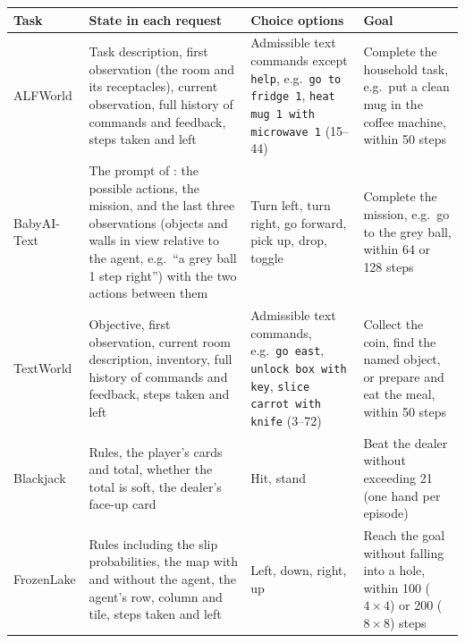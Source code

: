 \begin{tabularx}{\textwidth}{@{}l >{\raggedright\arraybackslash}X >{\raggedright\arraybackslash}p{3.3cm} >{\raggedright\arraybackslash}p{3.4cm}@{}}
    \toprule
    Task & State in each request & Choice options & Goal \\
    \midrule
    ALFWorld & Task description, first observation (the room and its receptacles), current observation, full history of commands and feedback, steps taken and left & Admissible text commands except \texttt{help}, e.g.\ \texttt{go to fridge 1}, \texttt{heat mug 1 with microwave 1} (15--44) & Complete the household task, e.g.\ put a clean mug in the coffee machine, within 50 steps \\
    \rowcolor{gray!10}BabyAI-Text & The prompt of \citet{carta2023grounding}: the possible actions, the mission, and the last three observations (objects and walls in view relative to the agent, e.g.\ ``a grey ball 1 step right'') with the two actions between them & Turn left, turn right, go forward, pick up, drop, toggle & Complete the mission, e.g.\ go to the grey ball, within 64 or 128 steps \\
    TextWorld & Objective, first observation, current room description, inventory, full history of commands and feedback, steps taken and left & Admissible text commands, e.g.\ \texttt{go east}, \texttt{unlock box with key}, \texttt{slice carrot with knife} (3--72) & Collect the coin, find the named object, or prepare and eat the meal, within 50 steps \\
    \rowcolor{gray!10}Blackjack & Rules, the player's cards and total, whether the total is soft, the dealer's face-up card & Hit, stand & Beat the dealer without exceeding 21 (one hand per episode) \\
    FrozenLake & Rules including the slip probabilities, the map with and without the agent, the agent's row, column and tile, steps taken and left & Left, down, right, up & Reach the goal without falling into a hole, within 100 ($4{\times}4$) or 200 ($8{\times}8$) steps \\
    \bottomrule
\end{tabularx}
